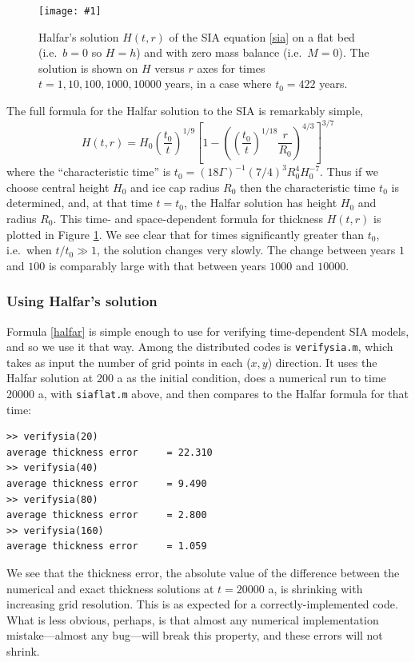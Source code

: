 \documentclass[titlepage,letterpaper,final,12pt]{scrartcl}
\newcommand{\onefigsize}[3]{
\begin{figure}[ht]
\centering
\texttt{[image: \#1]}
\caption{#2}
\label{fig:#1}
\end{figure}}
\begin{document}
\onefigsize{siascaling}{Halfar's solution $H(t,r)$ of the SIA equation \eqref{sia} on a flat bed (i.e.~$b=0$ so $H=h$) and with zero mass balance (i.e.~$M=0$).  The solution is shown on $H$ versus $r$ axes for times $t=1,10,100,1000,10000$ years, in a case where $t_0=422$ years.}{5.5in}

The full formula for the Halfar solution to the SIA is remarkably simple,
\begin{equation}
H(t,r) = H_0 \left(\frac{t_0}{t}\right)^{1/9} \left[1 - \left(\left(\frac{t_0}{t}\right)^{1/18} \frac{r}{R_0}\right)^{4/3}\right]^{3/7} \label{halfar}
\end{equation}
where the ``characteristic time'' is $t_0 = (18 \Gamma)^{-1} (7/4)^3 R_0^4 H_0^{-7}$.  Thus if we choose central height $H_0$ and ice cap radius $R_0$ then the characteristic time $t_0$ is determined, and, at that time $t=t_0$, the Halfar solution has height $H_0$ and radius $R_0$.  This time- and space-dependent formula for thickness $H(t,r)$ is plotted in Figure \ref{fig:siascaling}.  We see clear that for times significantly greater than $t_0$, i.e.~when $t/t_0 \gg 1$, the solution changes very slowly.  The change between years $1$ and $100$ is comparably large with that between years $1000$ and $10000$.

\subsubsection*{Using Halfar's solution}  Formula \eqref{halfar} is simple enough to use for verifying time-dependent SIA models, and so we use it that way.  Among the distributed codes is \texttt{verifysia.m}, which takes as input the number of grid points in each ($x,y$) direction.  It uses the Halfar solution at 200 a as the initial condition, does a numerical run to time 20000 a, with \texttt{siaflat.m} above, and then compares to the Halfar formula for that time:
\small
\begin{verbatim}
>> verifysia(20)
average thickness error     = 22.310
>> verifysia(40)
average thickness error     = 9.490
>> verifysia(80)
average thickness error     = 2.800
>> verifysia(160)
average thickness error     = 1.059
\end{verbatim}
\normalsize
We see that the thickness error, the absolute value of the difference between the numerical and exact thickness solutions at $t=20000$ a, is shrinking with increasing grid resolution.  This is as expected for a correctly-implemented code.  What is less obvious, perhaps, is that almost any numerical implementation mistake---almost any bug---will break this property, and these errors will not shrink.
\end{document}
